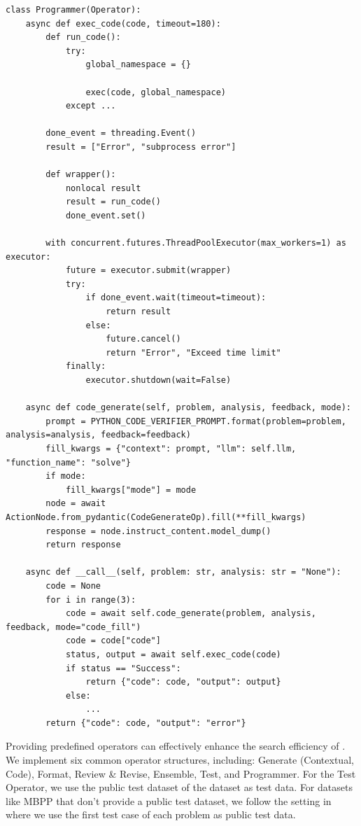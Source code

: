 \begin{tcolorbox}[title={\textbf{\small Operators}}, boxrule=1pt, arc=0mm, colback=black!5!white, colframe=black!75!white, breakable, before skip=10pt, after skip=10pt, pad at break=2mm, parbox=false]
\begin{verbatim}
class Programmer(Operator):
    async def exec_code(code, timeout=180):
        def run_code():
            try:
                global_namespace = {}
                
                exec(code, global_namespace)
            except ...

        done_event = threading.Event()
        result = ["Error", "subprocess error"]

        def wrapper():
            nonlocal result
            result = run_code()
            done_event.set()

        with concurrent.futures.ThreadPoolExecutor(max_workers=1) as executor:
            future = executor.submit(wrapper)
            try:
                if done_event.wait(timeout=timeout):
                    return result
                else:
                    future.cancel()
                    return "Error", "Exceed time limit"
            finally:
                executor.shutdown(wait=False)

    async def code_generate(self, problem, analysis, feedback, mode):
        prompt = PYTHON_CODE_VERIFIER_PROMPT.format(problem=problem, analysis=analysis, feedback=feedback)
        fill_kwargs = {"context": prompt, "llm": self.llm, "function_name": "solve"}
        if mode:
            fill_kwargs["mode"] = mode
        node = await ActionNode.from_pydantic(CodeGenerateOp).fill(**fill_kwargs)
        response = node.instruct_content.model_dump()
        return response

    async def __call__(self, problem: str, analysis: str = "None"):
        code = None
        for i in range(3):
            code = await self.code_generate(problem, analysis, feedback, mode="code_fill")
            code = code["code"]
            status, output = await self.exec_code(code)
            if status == "Success":
                return {"code": code, "output": output}
            else:
                ...
        return {"code": code, "output": "error"}
\end{verbatim}
\end{tcolorbox}

Providing predefined operators can effectively enhance the search efficiency of \model. We implement six common operator structures, including: Generate (Contextual, Code), Format, Review \& Revise, Ensemble, Test, and Programmer. For the Test Operator, we use the public test dataset of the dataset as test data. For datasets like MBPP that don't provide a public test dataset, we follow the setting in \citet{li2024debug} where we use the first test case of each problem as public test data.

